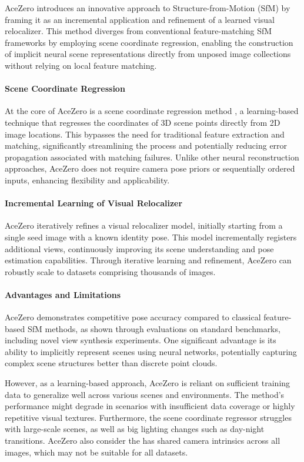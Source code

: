 AceZero \cite{brachmann2024acezero} introduces an innovative approach to Structure-from-Motion (SfM) by framing it as an incremental application and refinement of a learned visual relocalizer. 
This method diverges from conventional feature-matching SfM frameworks by employing scene coordinate regression, enabling the construction of implicit neural scene representations directly from unposed image collections without relying on local feature matching.

\paragraph{Scene Coordinate Regression}
At the core of AceZero is a scene coordinate regression method \cite{brachmann2023ace}, a learning-based technique that regresses the coordinates of 3D scene points directly from 2D image locations. 
This bypasses the need for traditional feature extraction and matching, significantly streamlining the process and potentially reducing error propagation associated with matching failures. Unlike other neural reconstruction approaches, AceZero does not require camera pose priors or sequentially ordered inputs, enhancing flexibility and applicability.

\paragraph{Incremental Learning of Visual Relocalizer}
AceZero iteratively refines a visual relocalizer model, initially starting from a single seed image with a known identity pose. 
This model incrementally registers additional views, continuously improving its scene understanding and pose estimation capabilities. 
Through iterative learning and refinement, AceZero can robustly scale to datasets comprising thousands of images.

\paragraph{Advantages and Limitations}
AceZero demonstrates competitive pose accuracy compared to classical feature-based SfM methods, as shown through evaluations on standard benchmarks, including novel view synthesis experiments. 
One significant advantage is its ability to implicitly represent scenes using neural networks, potentially capturing complex scene structures better than discrete point clouds.

However, as a learning-based approach, AceZero is reliant on sufficient training data to generalize well across various scenes and environments. 
The method's performance might degrade in scenarios with insufficient data coverage or highly repetitive visual textures. 
Furthermore, the scene coordinate regressor struggles with large-scale scenes, as well as big lighting changes such as day-night transitions.
AceZero also consider the has shared camera intrinsics across all images, which may not be suitable for all datasets.

